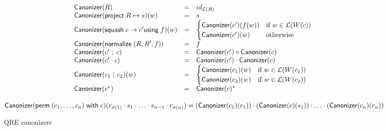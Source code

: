 \documentclass{svproc}
\newcommand{\kw}[1]{\ensuremath{\mathsf{#1}}}
\newcommand{\project}[2]{\ensuremath{\kw{project} \; #1 \mapsto #2}}
\newcommand{\squash}[3]{\ensuremath{\kw{squash} \; #1 \rightarrow #2
\kw{using} \; #3}}
\newcommand{\perm}[2]{\ensuremath{\kw{perm}\; (#1)\; \kw{with}\; #2}}
\newcommand{\normalize}[3]{\ensuremath{\kw{normalize} \; (#1, #2, #3)}}
\newcommand{\sep}{\ensuremath{\ | \ }}
\newcommand{\canonizer}{\ensuremath{\kw{Canonizer}}}
\begin{document}
\begin{figure}[t]
  \begin{center}
\[
    \begin{array}{l@\quad l @\quad l} 
      \canonizer(R) &=& id_{\mathcal{L}(R)} \\
      \canonizer(\project{R}{s})(w) &=& s\\
      \canonizer(\squash{c}{c'}{f})(w) &=& 
\begin{cases}
\canonizer(c')(f(w)) & \text{if } w \in \mathcal{L}(W(c))\\
\canonizer(c')(w) & \text{otherwise}
\end{cases}\\
      \canonizer(\normalize{R}{R'}{f}) &=& f\\
      \canonizer(c' \; ; \; c) &=& \canonizer(c') \circ \canonizer(c)\\
      \canonizer(c' \cdot c) &=& \canonizer(c') \cdot \canonizer(c)\\
      \canonizer(c_1 \sep c_2)(w) &=& 
\begin{cases}
\canonizer(c_1)(w) & \text{if } w \in \mathcal{L}(W(c_1))\\
\canonizer(c_2)(w) & \text{if } w \in \mathcal{L}(W(c_2))\\
\end{cases}\\
      \canonizer(c^*) &=& \canonizer(c)^* \\
    \end{array}
    \]
    \end{center}
    $\canonizer(\perm{c_1, \ldots, c_n}{c})(r_{\sigma(1)}
\cdot s_1 \cdot \ldots \cdot s_{n-1} \cdot r_{\sigma(n)}) \newline
= (\canonizer(c_1)(r_1)) \cdot (\canonizer(c)(s_1)) \cdot \ldots \cdot
(\canonizer(c_n)(r_n))$
  \caption{QRE canonizers}
  \label{fig:canonizers}
\end{figure}
\end{document}
